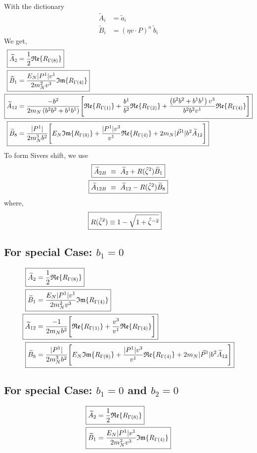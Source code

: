\documentclass[]{article}
\numberwithin{equation}{section}
\newcommand{\tcdot}{{\cdot}}
\newcommand{\tAmp}{\widetilde{A}}
\newcommand{\tBmp}{\widetilde{B}}
\newcommand{\tAmp}{\ensuremath{\widetilde{A}^{(+)}}}
\newcommand{\tBmp}{\ensuremath{\widetilde{B}^{(+)}}}
\newcommand{\bvec}{b}
\newcommand{\mN}{m_N}
\newcommand{\zetahat}{{\hat \zeta}}
\begin{document}
With the dictionary 
\begin{align}
	\tAmp_i & = \tilde a_i \\
	 \tBmp_i & = (\eta v \tcdot P)^n\ \tilde b_i
\end{align}
We get,
\begin{align}
    \Aboxed{\tAmp_2 = & \frac{1}{2}\mathfrak{Re}\{ R_{\Gamma(8)}\} }\\
    \Aboxed{\tBmp_1 = & \frac{E_{N}|P^1|v^1}{2\mN^2  v^3} \mathfrak{Im}\{ R_{\Gamma(4)}\}}\\
    \Aboxed{\tAmp_{12} =& \frac{-\bvec^2}{2\mN \left(\bvec^2\bvec^2 +\bvec^1\bvec^1\right)}\Bigg[\mathfrak{Re}\{ R_{\Gamma(1)}\} +\frac{b^1}{b^2}\mathfrak{Re}\{ R_{\Gamma(2)}\}+\frac{\left(\bvec^2\bvec^2 +\bvec^1\bvec^1\right)v^3}{\bvec^2\bvec^2v^1}\mathfrak{Re}\{ R_{\Gamma(4)}\}\Bigg]}\\
    \Aboxed{\tBmp_8 =& \frac{|P^1|}{ 2\mN^3  \bvec^2  } \Bigg[ E_N \mathfrak{Im}\{ R_{\Gamma(8)}\}+\frac{|P^1|v^3}{ v^1}\mathfrak{Re}\{ R_{\Gamma(4)}\}+2\mN  |\vec{P}^1|\bvec^2  \tAmp_{12}\Bigg]}
\end{align}
To form Sivers shift, we use
\begin{align}
    \Aboxed{\tAmp_{2B}  & \ \equiv\  \tAmp_2 + R(\zetahat^2) \tBmp_1}\\
    \Aboxed{\tAmp_{12B}  & \ \equiv\  \tAmp_{12} - R(\zetahat^2) \tBmp_8}
\end{align}
where,
\begin{align}
    \Aboxed{R(\zetahat^2) \equiv 1- \sqrt{1 + \hat \zeta^{-2}}}
\end{align}
\subsection{For special Case: $b_{1}=0$}
\begin{align}
    \Aboxed{\tAmp_2 = & \frac{1}{2}\mathfrak{Re}\{ R_{\Gamma(8)}\} }\\
    \Aboxed{\tBmp_1 = & \frac{E_{N}|P^1|v^1}{2\mN^2  v^3} \mathfrak{Im}\{ R_{\Gamma(4)}\}}\\
    \Aboxed{\tAmp_{12} =& \frac{-1}{2\mN \bvec^2}\Bigg[\mathfrak{Re}\{ R_{\Gamma(1)}\} +\frac{v^3}{v^1}\mathfrak{Re}\{ R_{\Gamma(4)}\}\Bigg]}\\
    \Aboxed{\tBmp_8 =& \frac{|P^1|}{ 2\mN^3  \bvec^2  } \Bigg[ E_N \mathfrak{Im}\{ R_{\Gamma(8)}\}+\frac{|P^1|v^3}{ v^1}\mathfrak{Re}\{ R_{\Gamma(4)}\}+2\mN  |\vec{P}^1|\bvec^2  \tAmp_{12}\Bigg]}
\end{align}

\subsection{For special Case: $b_{1}=0$ and $b_{2}=0$}
\begin{align}
    \Aboxed{\tAmp_2 = & \frac{1}{2}\mathfrak{Re}\{ R_{\Gamma(8)}\} }\\
    \Aboxed{\tBmp_1 = & \frac{E_{N}|P^1|v^1}{2\mN^2  v^3} \mathfrak{Im}\{ R_{\Gamma(4)}\}}
\end{align}
\end{document}

